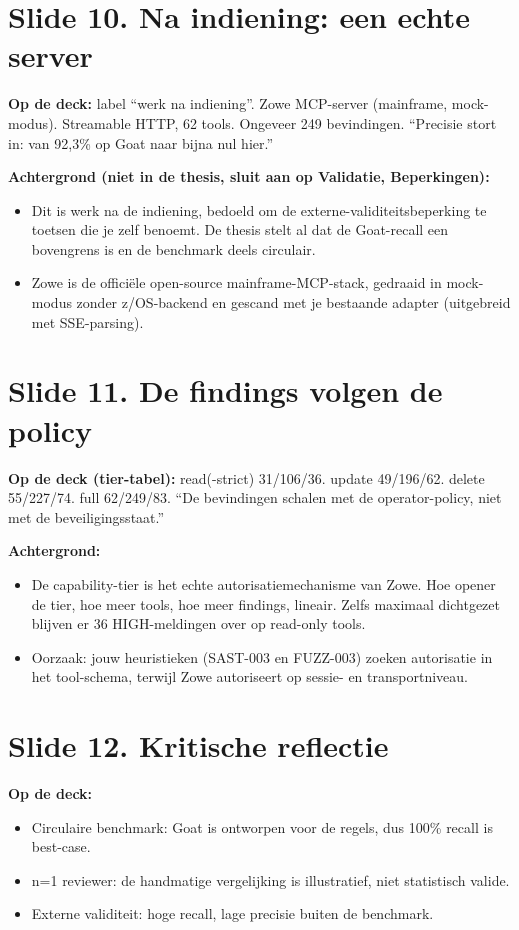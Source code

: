 \documentclass[11pt,a4paper]{article}
\begin{document}
\section{Slide 10. Na indiening: een echte server}
\textbf{Op de deck:} label ``werk na indiening''. Zowe MCP-server (mainframe, mock-modus). Streamable HTTP, 62 tools. Ongeveer 249 bevindingen. ``Precisie stort in: van 92,3\% op Goat naar bijna nul hier.''

\textbf{Achtergrond (niet in de thesis, sluit aan op Validatie, Beperkingen):}
\begin{itemize}
  \item Dit is werk na de indiening, bedoeld om de externe-validiteitsbeperking te toetsen die je zelf benoemt. De thesis stelt al dat de Goat-recall een bovengrens is en de benchmark deels circulair.
  \item Zowe is de offici\"ele open-source mainframe-MCP-stack, gedraaid in mock-modus zonder z/OS-backend en gescand met je bestaande adapter (uitgebreid met SSE-parsing).
\end{itemize}

\section{Slide 11. De findings volgen de policy}
\textbf{Op de deck (tier-tabel):} read(-strict) 31/106/36. update 49/196/62. delete 55/227/74. full 62/249/83. ``De bevindingen schalen met de operator-policy, niet met de beveiligingsstaat.''

\textbf{Achtergrond:}
\begin{itemize}
  \item De capability-tier is het echte autorisatiemechanisme van Zowe. Hoe opener de tier, hoe meer tools, hoe meer findings, lineair. Zelfs maximaal dichtgezet blijven er 36 HIGH-meldingen over op read-only tools.
  \item Oorzaak: jouw heuristieken (SAST-003 en FUZZ-003) zoeken autorisatie in het tool-schema, terwijl Zowe autoriseert op sessie- en transportniveau.
\end{itemize}

\section{Slide 12. Kritische reflectie}
\textbf{Op de deck:}
\begin{itemize}
  \item Circulaire benchmark: Goat is ontworpen voor de regels, dus 100\% recall is best-case.
  \item n=1 reviewer: de handmatige vergelijking is illustratief, niet statistisch valide.
  \item Externe validiteit: hoge recall, lage precisie buiten de benchmark.
\end{itemize}
\end{document}
